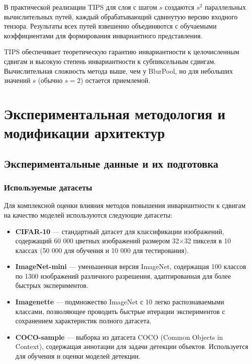 В практической реализации TIPS для слоя с шагом $s$ создаются $s^2$ параллельных вычислительных путей, каждый обрабатывающий сдвинутую версию входного тензора. Результаты всех путей взвешенно объединяются с обучаемыми коэффициентами для формирования инвариантного представления.

TIPS обеспечивает теоретическую гарантию инвариантности к целочисленным сдвигам и высокую степень инвариантности к субпиксельным сдвигам. Вычислительная сложность метода выше, чем у BlurPool, но для небольших значений $s$ (обычно $s=2$) остается приемлемой.

\newpage
\section{Экспериментальная методология и модификации архитектур}
\label{sec:Chapter4} 

\subsection{Экспериментальные данные и их подготовка}
\label{sec:experimental_data}

\subsubsection{Используемые датасеты}
\label{sec:datasets}

Для комплексной оценки влияния методов повышения инвариантности к сдвигам на качество моделей используются следующие датасеты:

\begin{itemize}
    \item \textbf{CIFAR-10} — стандартный датасет для классификации изображений, содержащий 60 000 цветных изображений размером 32×32 пикселя в 10 классах (50 000 для обучения и 10 000 для тестирования).
    
    \item \textbf{ImageNet-mini} — уменьшенная версия ImageNet, содержащая 100 классов по 1300 изображений различного разрешения, адаптированная для более быстрых экспериментов.
    
    \item \textbf{Imagenette} — подмножество ImageNet с 10 легко распознаваемыми классами, позволяющее проводить быстрые итерации экспериментов с сохранением характеристик полного датасета.
    
    \item \textbf{COCO-sample} — выборка из датасета COCO (Common Objects in Context), содержащая аннотации для задачи детекции объектов. Используется для обучения и оценки моделей детекции.
\end{itemize}

